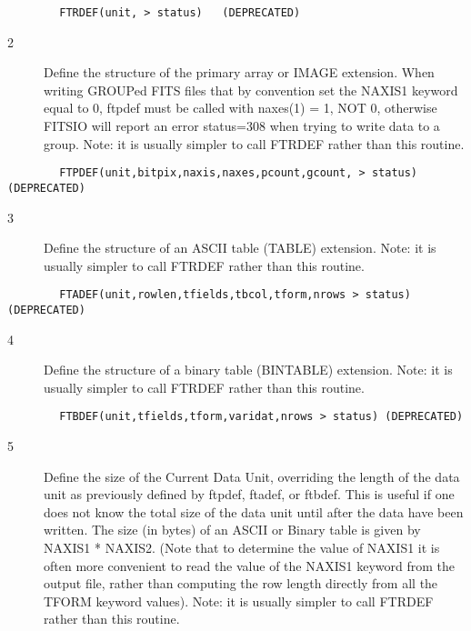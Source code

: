 \documentclass[11pt]{book}
\begin{document}
\begin{verbatim}
        FTRDEF(unit, > status)   (DEPRECATED)
\end{verbatim}

\begin{description}
\item[2 ]Define the structure of the primary array or IMAGE extension.  When
   writing GROUPed FITS files that by convention set the NAXIS1 keyword
   equal to 0, ftpdef must be called with naxes(1) = 1, NOT 0, otherwise
   FITSIO will report an error status=308 when trying to write data
   to a group. Note: it is usually simpler to call FTRDEF rather
  than this routine.
\end{description}

\begin{verbatim}
        FTPDEF(unit,bitpix,naxis,naxes,pcount,gcount, > status)  (DEPRECATED)
\end{verbatim}

\begin{description}
\item[3 ] Define the structure of an ASCII table (TABLE) extension. Note: it
   is usually simpler to call FTRDEF rather than this routine.
\end{description}

\begin{verbatim}
        FTADEF(unit,rowlen,tfields,tbcol,tform,nrows > status) (DEPRECATED)
\end{verbatim}

\begin{description}
\item[4 ] Define the structure of a binary table (BINTABLE) extension. Note: it
   is usually simpler to call FTRDEF rather than this routine.
\end{description}

\begin{verbatim}
        FTBDEF(unit,tfields,tform,varidat,nrows > status) (DEPRECATED)
\end{verbatim}

\begin{description}
\item[5 ] Define the size of the Current Data Unit, overriding the length
    of the data unit as previously defined by ftpdef, ftadef, or ftbdef.
    This is useful if one does not know the total size of the data unit until
    after the data have been written.  The size (in bytes) of an ASCII or
    Binary table is given by NAXIS1 * NAXIS2.  (Note that to determine the
    value of NAXIS1 it is often more convenient to read the value of the
    NAXIS1 keyword from the output file, rather than computing the row
    length directly from all the TFORM keyword values).  Note: it
   is usually simpler to call FTRDEF rather than this routine.
\end{description}
\end{document}
